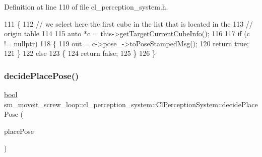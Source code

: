 Definition at line 110 of file cl\+\_\+perception\+\_\+system.\+h.


\begin{DoxyCode}
111             \{
112                 \textcolor{comment}{// we select here the first cube in the list that is located in the}
113                 \textcolor{comment}{// origin table}
114 
115                 \textcolor{keyword}{auto} *c = this->\hyperlink{classsm__moveit__screw__loop_1_1cl__perception__system_1_1ClPerceptionSystem_ad9231b87b9592cc5c847ce1b92a75446}{getTargetCurrentCubeInfo}();
116 
117                 \textcolor{keywordflow}{if} (c != \textcolor{keyword}{nullptr})
118                 \{
119                     out = c->pose\_->toPoseStampedMsg();
120                     \textcolor{keywordflow}{return} \textcolor{keyword}{true};
121                 \}
122                 \textcolor{keywordflow}{else}
123                 \{
124                     \textcolor{keywordflow}{return} \textcolor{keyword}{false};
125                 \}
126             \}
\end{DoxyCode}
\mbox{\label{classsm__moveit__screw__loop_1_1cl__perception__system_1_1ClPerceptionSystem_a9157b898cd0b4004cf3d9144f7c1d163}} 
\subsubsection{\texorpdfstring{decide\+Place\+Pose()}{decidePlacePose()}}
{\footnotesize\ttfamily \hyperlink{classbool}{bool} sm\+\_\+moveit\+\_\+screw\+\_\+loop\+::cl\+\_\+perception\+\_\+system\+::\+Cl\+Perception\+System\+::decide\+Place\+Pose (\begin{DoxyParamCaption}\item[{geometry\+\_\+msgs\+::\+Pose\+Stamped \&}]{place\+Pose }\end{DoxyParamCaption})\hspace{0.3cm}{\ttfamily [inline]}}



